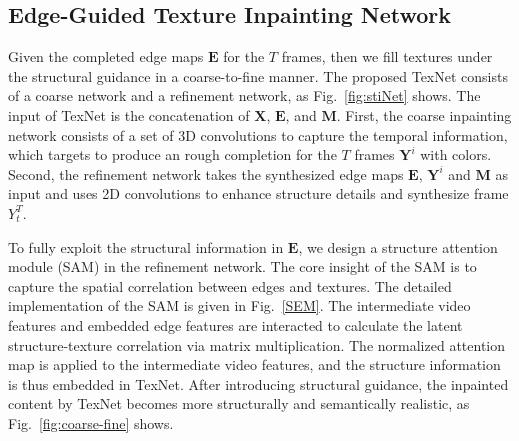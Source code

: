 \subsection{Edge-Guided Texture Inpainting Network}


Given the completed edge maps $\boldsymbol{E}$ for the 
$T$ frames, then we fill textures under the structural guidance in a coarse-to-fine manner. 
%
The proposed TexNet consists of a coarse network and a refinement network, as Fig.~\ref{fig:stiNet} shows.
%
The input of TexNet is the concatenation of $\boldsymbol{X}$, $\boldsymbol{E}$, and $\boldsymbol{M}$.
First, the coarse inpainting network consists of a set of 3D convolutions to capture the temporal information, which targets to produce an rough completion for the $T$ frames  $\boldsymbol{Y}^i$ with colors.
Second, the refinement network takes the synthesized edge maps $\boldsymbol{E}$, $\boldsymbol{Y}^i$ and $\boldsymbol{M}$ as input and uses 2D convolutions to enhance structure details and synthesize frame $Y^T_t$. 



To fully exploit the structural information in $\boldsymbol{E}$, we design a structure attention module (SAM) in the refinement network.
The core insight of the SAM is to capture the spatial correlation between edges and textures.
The detailed implementation of the SAM is given in Fig.~\ref{SEM}.
The intermediate video features and embedded edge features are interacted to calculate the latent structure-texture correlation via matrix multiplication. 
%
The normalized attention map is applied to the intermediate video features, and the structure information is thus embedded in TexNet.
After introducing structural guidance, the inpainted content by TexNet becomes more structurally and semantically realistic, as Fig.~\ref{fig:coarse-fine} shows.
 


